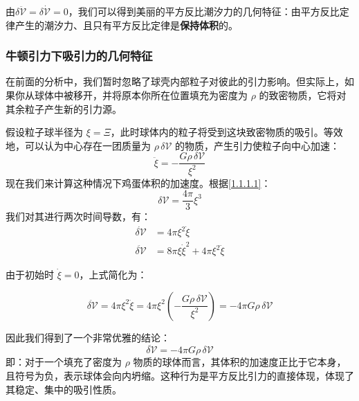 \documentclass{article}
\begin{document}
由$\delta\ddot{\mathcal V}=\delta\dot{\mathcal V}=0$，我们可以得到美丽的平方反比潮汐力的几何特征：由平方反比定律产生的潮汐力、且只有平方反比定律是\textbf{保持体积}的。

\subsubsection{牛顿引力下吸引力的几何特征}

在前面的分析中，我们暂时忽略了球壳内部粒子对彼此的引力影响。但实际上，如果你从球体中被移开，并将原本你所在位置填充为密度为 $\rho$ 的致密物质，它将对其余粒子产生新的引力源。

假设粒子球半径为 $\xi = \Xi$，此时球体内的粒子将受到这块致密物质的吸引。等效地，可以认为中心存在一团质量为 $\rho \, \delta \mathcal{V}$ 的物质，产生引力使粒子向中心加速：
\begin{equation*}
\ddot{\xi} = -\frac{G \rho \, \delta \mathcal{V}}{\xi^2}
\end{equation*}
现在我们来计算这种情况下鸡蛋体积的加速度。根据\eqref{1.1.1.1}：
\begin{equation*}
\delta \mathcal{V} = \frac{4\pi}{3} \xi^3
\end{equation*}
我们对其进行两次时间导数，有：
\begin{align*}
\dot{\delta \mathcal{V}} &= 4\pi \xi^2 \dot{\xi} \\
\ddot{\delta \mathcal{V}} &= 8\pi \xi \dot{\xi}^2 + 4\pi \xi^2 \ddot{\xi}
\end{align*}

由于初始时 $\dot{\xi} = 0$，上式简化为：

\begin{equation*}
\ddot{\delta \mathcal{V}} = 4\pi \xi^2 \ddot{\xi} = 4\pi \xi^2 \left( -\frac{G \rho \, \delta \mathcal{V}}{\xi^2} \right) = -4\pi G \rho \, \delta \mathcal{V}
\end{equation*}

因此我们得到了一个非常优雅的结论：
\begin{equation}
    \ddot{\delta \mathcal{V}} = -4\pi G \rho \, \delta \mathcal{V}
\end{equation}
即：对于一个填充了密度为 $\rho$ 物质的球体而言，其体积的加速度正比于它本身，且符号为负，表示球体会向内坍缩。这种行为是平方反比引力的直接体现，体现了其稳定、集中的吸引性质。
\end{document}
